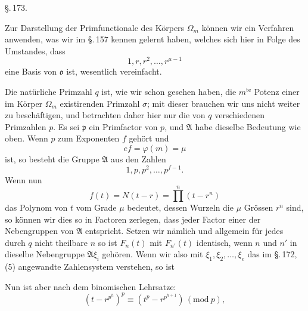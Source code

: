 \begin{center}
\S.\,173.

\end{center}

Zur Darstellung der Primfunctionale des Körpers $\Omega_m$ können wir ein Verfahren anwenden, was wir im \S.\,157 kennen gelernt haben, welches sich hier in Folge des Umstandes, dass
\[ 1, r, r^2, \ldots, r^{\mu-1} \]
eine Basis von $\mathfrak{o}$ ist, wesentlich vereinfacht.

Die natürliche Primzahl $q$ ist, wie wir schon gesehen haben, die $m^{\mathrm{te}}$ Potenz einer im Körper $\Omega_m$ existirenden Primzahl $\sigma$; mit dieser brauchen wir uns nicht weiter zu beschäftigen, und betrachten daher hier nur die von $q$ verschiedenen Primzahlen $p$.
Es sei $\mathfrak{p}$ ein Primfactor von $p$, und $\mathfrak{A}$ habe dieselbe Bedeutung wie oben. Wenn $p$ zum Exponenten $f$ gehört und
\[ ef = \varphi(m) = \mu \]
ist, so besteht die Gruppe $\mathfrak{A}$ aus den Zahlen
\[ 1, p, p^2, \ldots, p^{f-1}. \]
Wenn nun
\[ f(t) = N(t-r) = \prod^n (t - r^n) \]
das Polynom von $t$ vom Grade $\mu$ bedeutet, dessen Wurzeln die $\mu$ Grössen $r^n$ sind, so können wir dies so in Factoren zerlegen, dass jeder Factor einer der Nebengruppen von $\mathfrak{A}$ entspricht. Setzen wir nämlich
und allgemein für jedes durch $q$ nicht theilbare $n$
so ist $F_n(t)$ mit $F_{n'}(t)$ identisch, wenn $n$ und $n'$ in dieselbe Nebengruppe $\mathfrak{A}\xi_i$ gehören. Wenn wir also mit $\xi_1, \xi_2, \ldots, \xi_e$ das im \S.\,172, (5) angewandte Zahlensystem verstehen, so ist

Nun ist aber nach dem binomischen Lehrsatze:
\[ (t - r^{p^h})^p \equiv (t^p - r^{p^{h+1}}) \, (\mathrm{mod}\ p), \]
